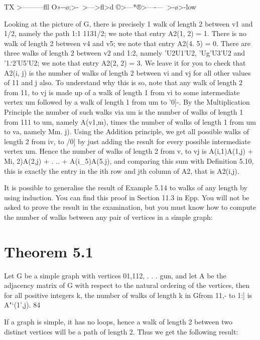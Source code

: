 ﻿\documentclass{beamer}
\begin{document}
{TX
>—\>—\>—\>ﬂl\J
O»-\>-\o;>-\
>—\CDUJ>ﬂ>d
©>—*®>—-\>—\
>-\o>-low



Looking at the picture of G, there is precisely 1 walk of length 2
between v1 and 1/2, namely the path 1:1 1131/2; we note that entry
A2(1, 2) = 1.
There is no walk of length 2 between v4 and v5; we note that entry
A2(4. 5) = 0.
There are three walks of length 2 between v2 and 1:2, namely 'U2U1'U2,
'Ug'U3'U2 and '1.‘2’U5'U2; we note that entry A2(2, 2) = 3.
We leave it for you to check that A2(i, j) is the number of walks of
length 2 between vi and vj for all other values of 11 and j also.
To understand why this is so, note that any walk of length 2 from 11,
to vj is made up of a walk of length 1 from vi to some intermediate
vertex um followed by a walk of length 1 from um to '0]-. By the
Multiplication Principle the number of such walks via um is the
number of walks of length 1 from 111 to um, namely A(v1,m), times the
number of walks of length 1 from um to va, namely Mm. j). Using
the Addition principle, we get all possible walks of length 2 from iv,
to /0] by just adding the result for every possible intermediate vertex
um. Hence the number of walks of length 2 from v, to vj is
A(i,1)A(1,j) + Mi, 2)A(2,j) + . .. + A(i_5)A(5.j),
and comparing this sum with Deﬁnition 5.10, this is exactly the
entry in the ith row and jth column of A2, that is A2(i,j).

It is possible to generalise the result of Example 5.14 to walks of any
length by using induction. You can ﬁnd this proof in Section 11.3 in
Epp. You will not be asked to prove the result in the examination,
but you must know how to compute the number of walks between
any pair of vertices in a simple graph:

\section{Theorem 5.1}
 Let G be a simple graph with vertices 01,112, . . . gun, and let
A be the adjacency matrix of G with respect to the natural ordering of
the vertices, then for all positive integers k, the number of walks of
length k in Gfrom 11,- to 1:] is A"‘(1',j).
84



If a graph is simple, it has no loops, hence a walk of length 2
between two distinct vertices will be a path of length 2. Thus we get
the following result:

}
\end{document}
